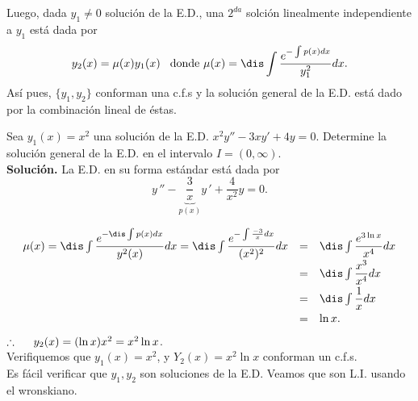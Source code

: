\documentclass{beamer}
\begin{document}
\begin{frame}[t]
	\begin{block}{}
		Luego, dada \(y_1 \ne 0\) solución de la E.D., una \(2^{da}\) solción linealmente independiente a \(y_1\) está dada por
		\[
			y_2(x) = \mu (x) y_1(x) \hspace{3mm} \mbox{donde } \mu (x) = \dis\int \dfrac{e^{-\int p(x) dx}}{y_1^2}dx.
		\]
		Así pues, \(\{y_1,y_2\}\) conforman una c.f.s y la solución general de la E.D. está dado por la combinación lineal de éstas.
	\end{block} \vspace{2mm}
	\begin{example}
		Sea \(y_1(x) = x^2\) una solución de la E.D. \(x^2y'' -3xy' +4y=0\). Determine la solución general de la E.D. en el intervalo \(I=(0, \infty)\). \\[2mm]
		\textbf{Solución.} La E.D. en su forma estándar está dada por
		\[
			y\,'' - \underbrace{\dfrac{3}{x} } _{p(x)} y\,' + \dfrac{4}{x^2} y =0.
		\]
	\end{example}
\end{frame}

\begin{frame}[t]
	\begin{exampleblock}{}
		\[
			\begin{array}{rcl}
				\mu (x) = \dis\int \dfrac{e^{- \dis\int p(x) dx}}{y^2(x)} dx = \dis\int \dfrac{e^{- \int \frac{-3}{x} dx}}{(x^2) ^2} dx & = & \dis\int \dfrac{e^{3 \ln x}}{x^4} dx \\[2mm]
				& = & \dis\int \dfrac{x^3}{x^4} dx \\[2mm]
				& = & \dis\int \dfrac{1}{x} dx \\[2mm]
				& = & \ln x.
			\end{array}
		\]
		\(\therefore \hspace{5mm} y_2(x) = (\ln x) x^2 = x^2 \ln x \). \\[2mm]
		Verifiquemos que \(y_1(x) = x^2\), y \(Y_2(x) = x^2 \ln x\) conforman un c.f.s. \\[2mm]
		Es fácil verificar que \(y_1,y_2\) son soluciones de la E.D. Veamos que son L.I. usando el wronskiano.
	\end{exampleblock}
\end{frame}
\end{document}
